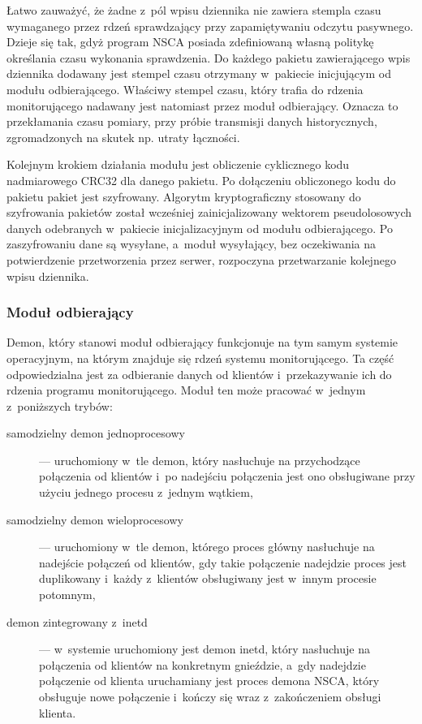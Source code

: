 Łatwo zauważyć, że żadne z~pól wpisu dziennika nie zawiera stempla
czasu wymaganego przez rdzeń sprawdzający przy zapamiętywaniu odczytu
pasywnego. Dzieje się tak, gdyż program NSCA posiada zdefiniowaną
własną politykę określania czasu wykonania sprawdzenia. Do każdego
pakietu zawierającego wpis dziennika dodawany jest stempel czasu
otrzymany w~pakiecie inicjującym od modułu odbierającego. Właściwy
stempel czasu, który trafia do rdzenia monitorującego nadawany jest
natomiast przez moduł odbierający. Oznacza to przekłamania czasu
pomiary, przy próbie transmisji danych historycznych, zgromadzonych na
skutek np. utraty łączności.

Kolejnym krokiem działania modułu jest obliczenie cyklicznego kodu
nadmiarowego CRC32 dla danego pakietu. Po dołączeniu obliczonego kodu
do pakietu pakiet jest szyfrowany. Algorytm kryptograficzny stosowany do
szyfrowania pakietów został wcześniej zainicjalizowany wektorem
pseudolosowych danych odebranych w~pakiecie inicjalizacyjnym od modułu
odbierającego. Po zaszyfrowaniu dane są wysyłane, a~moduł wysyłający,
bez oczekiwania na potwierdzenie przetworzenia przez serwer,
rozpoczyna przetwarzanie kolejnego wpisu dziennika.

\subsubsection[Moduł odbierający][Moduł odbierający]{Moduł odbierający}

Demon, który stanowi moduł odbierający funkcjonuje na tym samym
systemie operacyjnym, na którym znajduje się rdzeń systemu
monitorującego. Ta część odpowiedzialna jest za odbieranie danych od
klientów i~przekazywanie ich do rdzenia programu monitorującego. Moduł
ten może pracować w~jednym z~poniższych trybów:

\begin{description}
\item[samodzielny demon jednoprocesowy] --- uruchomiony w~tle demon, który
  nasłuchuje na przychodzące połączenia od klientów i~po nadejściu
  połączenia jest ono obsługiwane przy użyciu jednego procesu z~jednym
  wątkiem,
\item[samodzielny demon wieloprocesowy] --- uruchomiony w~tle demon,
  którego proces główny nasłuchuje na nadejście połączeń od klientów,
  gdy takie połączenie nadejdzie proces jest duplikowany i~każdy
  z~klientów obsługiwany jest w~innym procesie potomnym,
\item[demon zintegrowany z~inetd] --- w~systemie uruchomiony jest demon
  inetd, który nasłuchuje na połączenia od klientów na konkretnym
  gnieździe, a~gdy nadejdzie połączenie od klienta uruchamiany jest
  proces demona NSCA, który obsługuje nowe połączenie i~kończy się
  wraz z~zakończeniem obsługi klienta.
\end{description}

